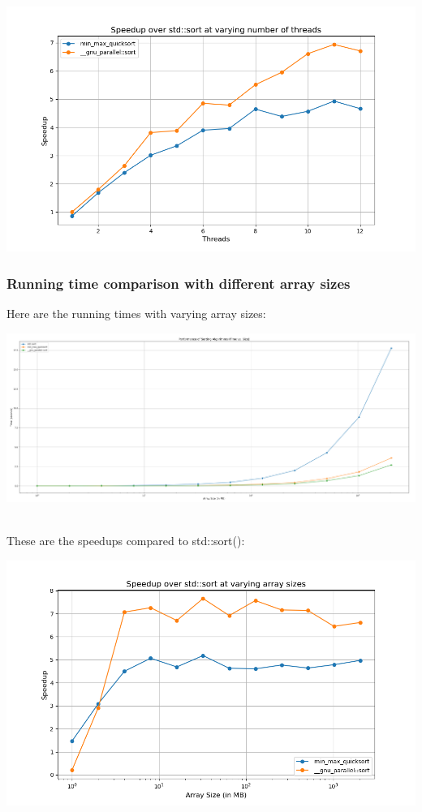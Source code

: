 \documentclass[../../main.tex]{subfiles}
\begin{document}
\includegraphics[width=\linewidth]{./speedup.png}


\newpage
\subsubsection{Running time comparison with different array sizes}
Here are the running times with varying array sizes:

\includegraphics[width=\linewidth]{./running_times_array.png}

~\\
These are the speedups compared to std::sort():

\includegraphics[width=\linewidth]{./speedup_array.png}
\end{document}
